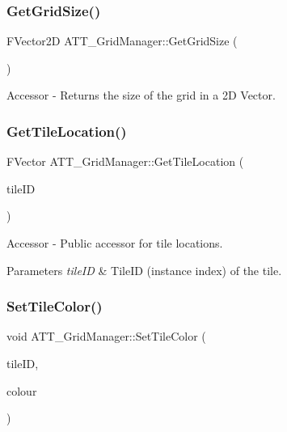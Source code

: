 \mbox{\label{class_a_t_t___grid_manager_ac32858e31de063415fcb5131962d4a59}} 
\subsubsection{\texorpdfstring{GetGridSize()}{GetGridSize()}}
{\footnotesize\ttfamily F\+Vector2D A\+T\+T\+\_\+\+Grid\+Manager\+::\+Get\+Grid\+Size (\begin{DoxyParamCaption}{ }\end{DoxyParamCaption})}



Accessor -\/ Returns the size of the grid in a 2D Vector. 

\mbox{\label{class_a_t_t___grid_manager_a8498f5d3bf51947e60b9604cc8a6ae37}} 
\subsubsection{\texorpdfstring{GetTileLocation()}{GetTileLocation()}}
{\footnotesize\ttfamily F\+Vector A\+T\+T\+\_\+\+Grid\+Manager\+::\+Get\+Tile\+Location (\begin{DoxyParamCaption}\item[{int}]{tile\+ID }\end{DoxyParamCaption})}



Accessor -\/ Public accessor for tile locations. 


\begin{DoxyParams}{Parameters}
{\em tile\+ID} & Tile\+ID (instance index) of the tile. \\
\hline
\end{DoxyParams}
\mbox{\label{class_a_t_t___grid_manager_a6e53d6048a017a5b3b799a001103ed04}} 
\subsubsection{\texorpdfstring{SetTileColor()}{SetTileColor()}}
{\footnotesize\ttfamily void A\+T\+T\+\_\+\+Grid\+Manager\+::\+Set\+Tile\+Color (\begin{DoxyParamCaption}\item[{int}]{tile\+ID,  }\item[{F\+Linear\+Color}]{colour }\end{DoxyParamCaption})}



